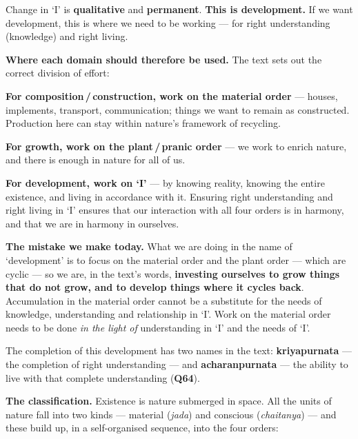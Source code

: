 \begin{keybox}
Change in `I' is \textbf{qualitative} and \textbf{permanent}. \textbf{This is
development.} If we want development, this is where we need to be working ---
for right understanding (knowledge) and right living.
\end{keybox}

\textbf{Where each domain should therefore be used.} The text sets out the
correct division of effort:

\begin{abul}
\item \textbf{For composition\,/\,construction, work on the material order} ---
      houses, implements, transport, communication; things we want to remain
      as constructed. Production here can stay within nature's framework of
      recycling.
\item \textbf{For growth, work on the plant\,/\,pranic order} --- we work to
      enrich nature, and there is enough in nature for all of us.
\item \textbf{For development, work on `I'} --- by knowing reality, knowing
      the entire existence, and living in accordance with it. Ensuring right
      understanding and right living in `I' ensures that our interaction with
      all four orders is in harmony, and that we are in harmony in ourselves.
\end{abul}

\textbf{The mistake we make today.} What we are doing in the name of
`development' is to focus on the material order and the plant order --- which
are cyclic --- so we are, in the text's words, \textbf{investing ourselves to
grow things that do not grow, and to develop things where it cycles back}.
Accumulation in the material order cannot be a substitute for the needs of
knowledge, understanding and relationship in `I'. Work on the material order
needs to be done \emph{in the light of} understanding in `I' and the needs of
`I'.

The completion of this development has two names in the text:
\textbf{kriyapurnata} --- the completion of right understanding --- and
\textbf{acharanpurnata} --- the ability to live with that complete
understanding (\textbf{Q64}).


\ans \textbf{The classification.} Existence is nature submerged in space. All
the units of nature fall into two kinds --- material (\emph{jada}) and
conscious (\emph{chaitanya}) --- and these build up, in a self-organised
sequence, into the four orders:

